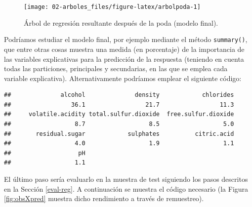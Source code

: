 \documentclass[
  spanish,
]{book}
\newenvironment{Shaded}{\begin{snugshade}}{\end{snugshade}}
\newcommand{\CommentTok}[1]{\textcolor[rgb]{0.56,0.35,0.01}{\textit{#1}}}
\newcommand{\DecValTok}[1]{\textcolor[rgb]{0.00,0.00,0.81}{#1}}
\newcommand{\FunctionTok}[1]{\textcolor[rgb]{0.00,0.00,0.00}{#1}}
\newcommand{\NormalTok}[1]{#1}
\newcommand{\OtherTok}[1]{\textcolor[rgb]{0.56,0.35,0.01}{#1}}
\newcommand{\SpecialCharTok}[1]{\textcolor[rgb]{0.00,0.00,0.00}{#1}}
\theoremstyle{break}
\theoremstyle{definition}
\theoremstyle{definition}
\theoremstyle{definition}
\theoremstyle{definition}
\theoremstyle{remark}
\begin{document}
\begin{figure}[!htb]

{\centering \texttt{[image: 02-arboles\_files/figure-latex/arbolpoda-1]} 

}

\caption{Árbol de regresión resultante después de la poda (modelo final).}\label{fig:arbolpoda}
\end{figure}

Podríamos estudiar el modelo final, por ejemplo mediante el método \texttt{summary()}, que entre otras cosas muestra una medida (en porcentaje) de la importancia de las variables explicativas para la predicción de la respuesta (teniendo en cuenta todas las particiones, principales y secundarias, en las que se emplea cada variable explicativa).
Alternativamente podríamos emplear el siguiente código:

\begin{Shaded}
\end{Shaded}

\begin{verbatim}
##              alcohol              density            chlorides 
##                 36.1                 21.7                 11.3 
##     volatile.acidity total.sulfur.dioxide  free.sulfur.dioxide 
##                  8.7                  8.5                  5.0 
##       residual.sugar            sulphates          citric.acid 
##                  4.0                  1.9                  1.1 
##                   pH 
##                  1.1
\end{verbatim}

El último paso sería evaluarlo en la muestra de test siguiendo los pasos descritos en la Sección \ref{eval-reg}. A continuación se muestra el código necesario (la Figura \ref{fig:obsXpred} muestra dicho rendimiento a través de remuestreo).
\end{document}
